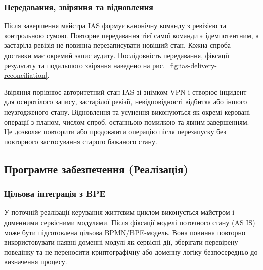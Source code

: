 \documentclass{article}
\begin{document}
\subsubsection{Передавання, звіряння та відновлення}
Після завершення майстра IAS формує канонічну команду з ревізією та контрольною сумою. Повторне передавання тієї самої команди є ідемпотентним, а застаріла ревізія не повинна перезаписувати новіший стан. Кожна спроба доставки має окремий запис аудиту. Послідовність передавання, фіксації результату та подальшого звіряння наведено на рис.~\ref{fig:ias-delivery-reconciliation}.

Звіряння порівнює авторитетний стан IAS зі знімком VPN і створює інцидент для осиротілого запису, застарілої ревізії, невідповідності відбитка або іншого неузгодженого стану. Відновлення та усунення виконуються як окремі керовані операції з планом, числом спроб, останньою помилкою та явним завершенням. Це дозволяє повторити або продовжити операцію після перезапуску без повторного застосування старого бажаного стану.

\subsection{Програмне забезпечення (Реалізація)}

\subsubsection{Цільова інтеграція з BPE}
У поточній реалізації керування життєвим циклом виконується майстром і доменними сервісними модулями. Після фіксації моделі поточного стану (AS IS) може бути підготовлена цільова BPMN/BPE-модель. Вона повинна повторно використовувати наявні доменні модулі як сервісні дії, зберігати перевірену поведінку та не переносити криптографічну або доменну логіку безпосередньо до визначення процесу.
\end{document}
